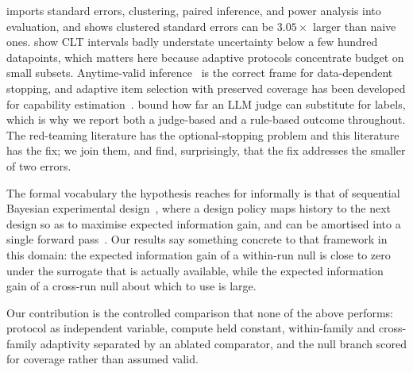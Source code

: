  \citet{miller2024errorbars} imports standard errors, clustering,
paired inference, and power analysis into evaluation, and shows clustered standard errors can be
$3.05\times$ larger than naive ones. \citet{bowyer2025clt} show CLT intervals badly understate
uncertainty below a few hundred datapoints, which matters here because adaptive protocols
concentrate budget on small subsets. Anytime-valid inference~\cite{ramdas2022savi,lindon2022anytime}
is the correct frame for data-dependent stopping, and adaptive item selection with preserved
coverage has been developed for capability estimation~\cite{polo2024tinybenchmarks,krumdick2026wild,wu2026faq,tolochinsky2026valid}.
\citet{dorner2024limits} bound how far an LLM judge can substitute for labels, which is why we
report both a judge-based and a rule-based outcome throughout. The red-teaming literature has the
optional-stopping problem and this literature has the fix; we join them, and find, surprisingly,
that the fix addresses the smaller of two errors.

 The formal vocabulary the hypothesis reaches for informally is
that of sequential Bayesian experimental design~\cite{rainforth2023boed}, where a design policy maps
history to the next design so as to maximise expected information gain, and can be amortised into a
single forward pass~\cite{foster2021dad}. Our results say something concrete to that framework in
this domain: the expected information gain of a within-run null is close to zero under the surrogate
that is actually available, while the expected information gain of a cross-run null about which
\family to use is large.

 Our contribution is the controlled comparison that none of the above performs:
protocol as independent variable, compute held constant, within-family and cross-family adaptivity
separated by an ablated comparator, and the null branch scored for coverage rather than assumed
valid.
